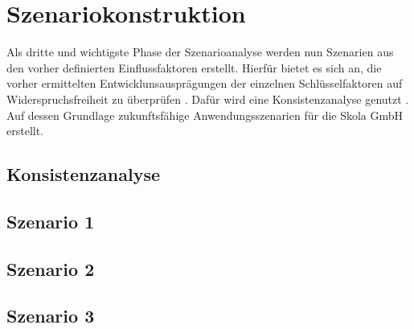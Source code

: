 \section{Szenariokonstruktion}
\label{constructions}
Als dritte und wichtigste Phase der Szenarioanalyse werden nun Szenarien aus den vorher definierten Einflussfaktoren erstellt. Hierfür bietet es sich an, die vorher ermittelten Entwicklunsausprägungen der einzelnen Schlüsselfaktoren auf Widerspruchsfreiheit zu überprüfen . Dafür wird eine Konsistenzanalyse genutzt \cite{spath}. Auf dessen Grundlage zukunftsfähige Anwendungsszenarien für die Skola GmbH erstellt.

\subsection{Konsistenzanalyse}

\subsection{Szenario 1}

\subsection{Szenario 2}

\subsection{Szenario 3}

